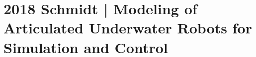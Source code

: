 \section{2018 Schmidt | Modeling of Articulated Underwater Robots for Simulation and Control}

\cite{schmidt2018} 
